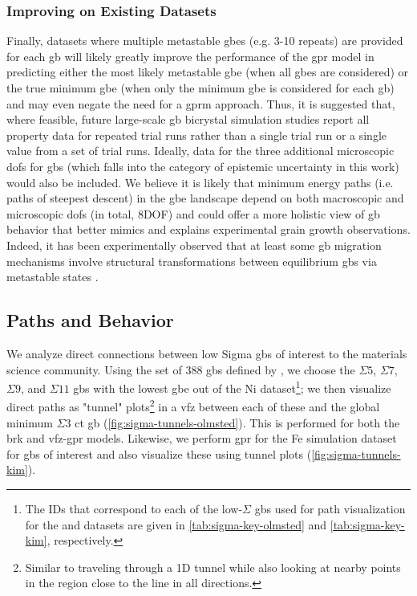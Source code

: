 \documentclass[final,twocolumn,12pt]{elsarticle}
\begin{document}
	\subsubsection{Improving on Existing Datasets} \label{sec:results:lit:improve}
	Finally, datasets where multiple metastable \glspl{gbe} (e.g. 3-10 repeats) are provided for each \gls{gb} will likely greatly improve the performance of the \gls{gpr} model in predicting either the most likely metastable \gls{gbe} (when all \glspl{gbe} are considered) or the true minimum \gls{gbe} (when only the minimum \gls{gbe} is considered for each \gls{gb}) and may even negate the need for a \gls{gprm} approach. Thus, it is suggested that, where feasible, future large-scale \gls{gb} bicrystal simulation studies report all property data for repeated trial runs rather than a single trial run or a single value from a set of trial runs. Ideally, data for the three additional microscopic \glspl{dof} for \glspl{gb} (which falls into the category of epistemic uncertainty in this work) would also be included. We believe it is likely that minimum energy paths (i.e. paths of steepest descent) in the \gls{gbe} landscape depend on both macroscopic and microscopic \glspl{dof} (in total, 8DOF) and could offer a more holistic view of \gls{gb} behavior that better mimics and explains experimental grain growth observations. Indeed, it has been experimentally observed that at least some \gls{gb} migration mechanisms involve structural transformations between equilibrium \glspl{gb} via metastable states \cite{weiDirectImagingAtomistic2021}.
	
	\subsection{ Paths and  Behavior} \label{sec:results:paths}

	We analyze direct connections between low Sigma \glspl{gb} of interest to the materials science community. Using the set of 388 \glspl{gb} defined by \citet{olmstedSurveyComputedGrain2009}, we choose the $\Sigma5$, $\Sigma7$, $\Sigma9$, and $\Sigma11$ \glspl{gb} with the lowest \gls{gbe} out of the \citet{olmstedSurveyComputedGrain2009} Ni dataset\footnote{The IDs that correspond to each of the low-$\Sigma$ \glspl{gb} used for path visualization for the \citet{olmstedSurveyComputedGrain2009} and \citet{kimPhasefieldModeling3D2014} datasets are given in \cref{tab:sigma-key-olmsted} and \cref{tab:sigma-key-kim}, respectively. }; we then visualize direct paths as "tunnel" plots\footnote{Similar to traveling through a 1D tunnel while also looking at nearby points in the region close to the line in all directions.} in a \gls{vfz} between each of these and the global minimum $\Sigma3$ \gls{ct} \gls{gb} (\cref{fig:sigma-tunnels-olmsted}). This is performed for both the \gls{brk} and \gls{vfz}-\gls{gpr} models. Likewise, we perform \gls{gpr} for the Fe simulation dataset for \glspl{gb} of interest and also visualize these using tunnel plots (\cref{fig:sigma-tunnels-kim}).
\end{document}
